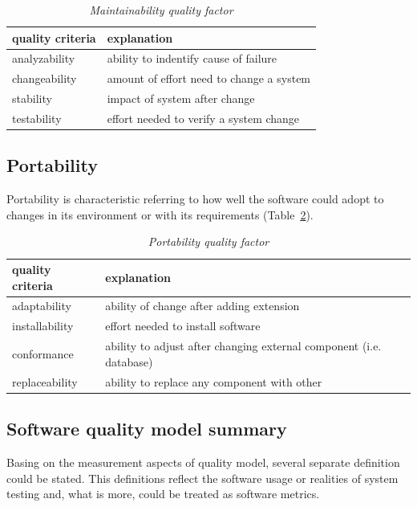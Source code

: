 \begin{table}[h!]
	\centering
\begin{tabular}{|l|l|}
\hline
{\bf quality criteria} & {\bf explanation} \\
\hline
analyzability & ability to indentify cause of failure \\
\hline
changeability & amount of effort need to change a system \\
\hline
 stability & impact of system after change  \\
\hline
testability & effort needed to verify a system change \\
\hline
\end{tabular}	
	\caption{\textit{Maintainability quality factor}}
	\label{tab:maintainability_factor}
\end{table}



\subsection{Portability}
Portability is characteristic referring to how well the software could adopt to changes in its environment or with its requirements (Table~\ref{tab:portability_factor}). 

\begin{table}[h!]
	\centering
\begin{tabular}{|l|l|}
\hline
{\bf quality criteria} & {\bf explanation} \\
\hline
adaptability & ability of change after adding extension \\
\hline
installability & effort needed to install software \\
\hline
conformance &  ability to adjust after changing external component (i.e. database) \\
\hline
replaceability & ability to replace any component with other  \\
\hline
\end{tabular}	
	\caption{\textit{Portability quality factor}}
	\label{tab:portability_factor}
\end{table} 

\subsection{Software quality model summary}
Basing on the measurement aspects of quality model, several separate definition could be stated. This definitions reflect the software usage or realities of system testing and, what is more, could be treated as software metrics. 

